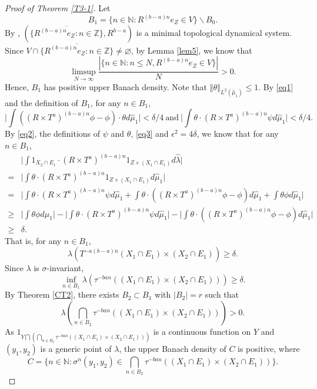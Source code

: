 \documentclass[reqno,12pt]{amsart}
\newcommand{\norm}[1]{\left\Vert #1\right\Vert}
\def \N {\mathbb N}
\def \Z {\mathbb Z}
\def \ep {\epsilon}
\numberwithin{equation}{section}
\begin{document}
\begin{proof}[Proof of Theorem \ref{T3-1}]
Let $$B_1=\{n\in \N:R^{(b-a)n}e_{Z}\in V\}\backslash B_0.$$ By \cite[Proposition 4.5]{HK}, $(\overline{\{R^{(b-a)n}e_{Z}:n\in \Z\}},R^{b-a})$ is a minimal topological dynamical system. Since $V\cap \overline{\{R^{(b-a)n}e_{Z}:n\in \Z\}}\neq \varnothing$, by Lemma \ref{lem5}, we know that $$\limsup_{N\to\infty}\frac{|\{n\in \N:n\le N,R^{(b-a)n}e_{Z}\in V\}|}{N}>0.$$ Hence, $B_1$ has positive upper Banach density. Note that $\norm{\theta}_{L^{2}(\hat{\mu}_1)}\le 1$. By \eqref{eq1} and the definition of $B_1$, for any $n\in B_1$, 
		\begin{equation}\label{eq2}
			\Big|\int ((R\times T^a)^{(b-a)n}\phi-\phi)\cdot \theta d\hat{\mu}_1\Big|< \delta/4\ \text{and}\ \Big|\int \theta\cdot(R\times T^a)^{(b-a)n}\psi d\hat{\mu}_1\Big|<\delta/4.
		\end{equation}
		By \eqref{eq2}, the definitions of $\psi$ and $\theta$, \eqref{eq3} and $\ep^{2}=4\delta$, we know that for any $n\in B_1$,
		\begin{align*}
			& \Big|\int 1_{X_2\cap E_1} \cdot (R\times T^a)^{(b-a)n}1_{Z\times (X_1\cap E_1)}d\hat{\lambda}\Big|
			\\ = &
			\Big|\int \theta \cdot (R\times T^a)^{(b-a)n}1_{Z\times (X_1\cap E_1)}d\hat{\mu}_1\Big|
			\\ = &
			\Big|\int \theta \cdot (R\times T^a)^{(b-a)n}\psi d\hat{\mu}_1+\int \theta \cdot ((R\times T^a)^{(b-a)n}\phi -\phi) d\hat{\mu}_1+\int \theta\phi d\hat{\mu}_1\Big|
			\\ \ge &
			\Big|\int \theta\phi d\hat{\mu}_1\Big|-\Big|\int \theta \cdot (R\times T^a)^{(b-a)n}\psi d\hat{\mu}_1\Big|-\Big|\int \theta \cdot ((R\times T^a)^{(b-a)n}\phi -\phi) d\hat{\mu}_1\Big|
			\\ \ge &
			\delta.
		\end{align*}
	That is, for any $n\in B_1$,
		\begin{equation}\label{eq4}
			\lambda(T^{-a(b-a)n}(X_1\cap E_1)\times (X_2\cap E_1))\ge \delta.
		\end{equation}
		Since $\lambda$ is $\sigma$-invariant, $$\inf_{n\in B_1}\lambda(\tau^{-ban}((X_1\cap E_1)\times (X_2\cap E_1)))\ge \delta.$$
		By Theorem \ref{CT2}, there exists $B_2\subset B_1$ with $|B_2|=r$ such that
		$$\lambda(\bigcap_{n\in B_2}\tau^{-ban}((X_1\cap E_1)\times (X_2\cap E_1)))>0.$$ As $\displaystyle 1_{Y\bigcap (\bigcap_{n\in B_2}\tau^{-ban}((X_1\cap E_1)\times (X_2\cap E_1)))}$ is a continuous function on $Y$ and $(y_1,y_2)$ is a generic point of $\lambda$, the upper Banach density of $C$ is positive, where $$C=\{n\in\N: \sigma^{n}(y_1,y_2)\in \bigcap_{n\in B_2}\tau^{-ban}((X_1\cap E_1)\times (X_2\cap E_1))\}.$$
		

\end{proof}
\end{document}

